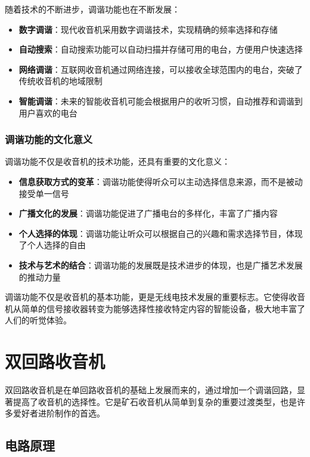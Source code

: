 \documentclass[12pt,UTF8]{ctexbook}
\begin{document}
随着技术的不断进步，调谐功能也在不断发展：

\begin{itemize}[leftmargin=3.5em]
    \item \textbf{数字调谐}：现代收音机采用数字调谐技术，实现精确的频率选择和存储
    \item \textbf{自动搜索}：自动搜索功能可以自动扫描并存储可用的电台，方便用户快速选择
    \item \textbf{网络调谐}：互联网收音机通过网络连接，可以接收全球范围内的电台，突破了传统收音机的地域限制
    \item \textbf{智能调谐}：未来的智能收音机可能会根据用户的收听习惯，自动推荐和调谐到用户喜欢的电台
\end{itemize}

\subsection{调谐功能的文化意义}

调谐功能不仅是收音机的技术功能，还具有重要的文化意义：

\begin{itemize}[leftmargin=3.5em]
    \item \textbf{信息获取方式的变革}：调谐功能使得听众可以主动选择信息来源，而不是被动接受单一信号
    \item \textbf{广播文化的发展}：调谐功能促进了广播电台的多样化，丰富了广播内容
    \item \textbf{个人选择的体现}：调谐功能让听众可以根据自己的兴趣和需求选择节目，体现了个人选择的自由
    \item \textbf{技术与艺术的结合}：调谐功能的发展既是技术进步的体现，也是广播艺术发展的推动力量
\end{itemize}

调谐功能不仅是收音机的基本功能，更是无线电技术发展的重要标志。它使得收音机从简单的信号接收器转变为能够选择性接收特定内容的智能设备，极大地丰富了人们的听觉体验。

\chapter{双回路收音机}

双回路收音机是在单回路收音机的基础上发展而来的，通过增加一个调谐回路，显著提高了收音机的选择性。它是矿石收音机从简单到复杂的重要过渡类型，也是许多爱好者进阶制作的首选。

\section{电路原理}
\end{document}
